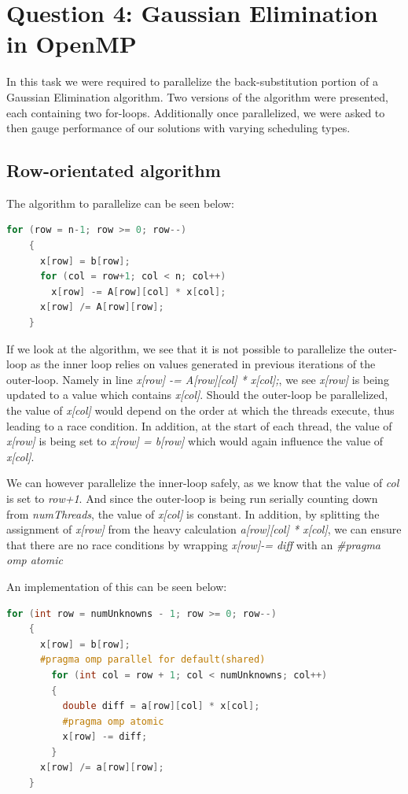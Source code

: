 \section{Question 4: Gaussian Elimination in OpenMP}

In this task we were required to parallelize the back-substitution portion of a Gaussian Elimination algorithm. 
Two versions of the algorithm were presented, each containing two for-loops. 
Additionally once parallelized, we were asked to then gauge performance of our solutions with varying scheduling types. 

  \subsection{Row-orientated algorithm}
  The algorithm to parallelize can be seen below:
  \begin{lstlisting}[language=C++]
    for (row = n-1; row >= 0; row--) 
    {
      x[row] = b[row];
      for (col = row+1; col < n; col++)
        x[row] -= A[row][col] * x[col];
      x[row] /= A[row][row];
    }
  \end{lstlisting}

  If we look at the algorithm, we see that it is not possible to parallelize the outer-loop as the inner loop relies on values generated in 
  previous iterations of the outer-loop. 
  Namely in line \textit{x[row] -= A[row][col] * x[col];}, we see \textit{x[row]} is being updated to a value which contains \textit{x[col]}. 
  Should the outer-loop be parallelized, the value of \textit{x[col]} would depend on the order at which the threads execute, thus leading to a race condition. 
  In addition, at the start of each thread, the value of \textit{x[row]} is being set to \textit{x[row] = b[row]} which would again influence the value of \textit{x[col]}.
  
  
  We can however parallelize the inner-loop safely, as we know that the value of \textit{col} is set to \textit{row+1}. And since the outer-loop is being run 
  serially counting down from \textit{numThreads}, the value of \textit{x[col]} is constant.   
  In addition, by splitting the assignment of \textit{x[row]} from the heavy calculation \textit{a[row][col] * x[col]}, we can ensure that there are no race conditions by wrapping 
  \textit{x[row]-= diff} with an \textit{\#pragma omp atomic}

  An implementation of this can be seen below:
  \begin{lstlisting}[language=C++]
    for (int row = numUnknowns - 1; row >= 0; row--)
    {
      x[row] = b[row];
      #pragma omp parallel for default(shared)
        for (int col = row + 1; col < numUnknowns; col++)
        {
          double diff = a[row][col] * x[col];
          #pragma omp atomic
          x[row] -= diff;
        }
      x[row] /= a[row][row];
    }
  \end{lstlisting}
  
